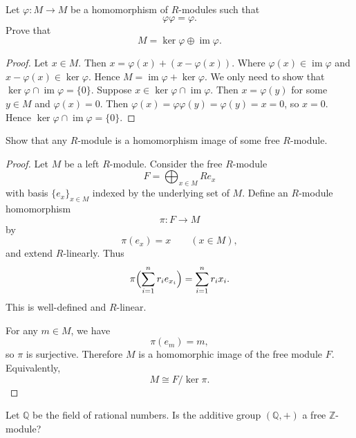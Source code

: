 \documentclass[11pt, a4paper]{report}
\begin{document}
\begin{exercise}
    Let $\varphi : M \to M$ be a homomorphism of $R$-modules such that
    \[
        \varphi\varphi=\varphi.
    \]
    Prove that
    \[
        M=\ker\varphi \oplus \operatorname{im}\varphi.
    \]
\end{exercise}

\begin{proof}
    Let $x \in M$. Then $x = \varphi(x) + (x - \varphi(x))$. Where $\varphi(x) \in
    \operatorname{im}\varphi$ and $x - \varphi(x) \in \ker\varphi$. Hence $M =
    \operatorname{im}\varphi + \ker\varphi$. We only need to show that $\ker\varphi \cap
    \operatorname{im}\varphi = \{0\}$.
    Suppose $x \in \ker\varphi \cap \operatorname{im}\varphi$. Then $x = \varphi(y)$ for some
    $y \in M$ and $\varphi(x) = 0$. Then $\varphi(x) = \varphi \varphi(y) = \varphi(y)=x=0$,
    so $x = 0$. Hence $\ker\varphi \cap \operatorname{im}\varphi = \{0\}$.
\end{proof}

\begin{exercise}
    Show that any $R$-module is a homomorphism image of some free $R$-module.
\end{exercise}

\begin{proof}
    Let $M$ be a left $R$-module. Consider the free $R$-module
    \[
        F=\bigoplus_{x\in M} Re_x
    \]
    with basis $\{e_x\}_{x\in M}$ indexed by the underlying set of $M$.
    Define an $R$-module homomorphism
    \[
        \pi:F\to M
    \]
    by
    \[
        \pi(e_x)=x \qquad (x\in M),
    \]
    and extend $R$-linearly. Thus
    \[
        \pi\Bigl(\sum_{i=1}^n r_i e_{x_i}\Bigr)=\sum_{i=1}^n r_i x_i.
    \]
    This is well-defined and $R$-linear.

    For any $m\in M$, we have
    \[
        \pi(e_m)=m,
    \]
    so $\pi$ is surjective. Therefore $M$ is a homomorphic image of the free module $F$.
    Equivalently,
    \[
        M\cong F/\ker\pi.
    \]
\end{proof}

\begin{exercise}
    Let $\mathbb{Q}$ be the field of rational numbers. Is the additive group
    $(\mathbb{Q},+)$ a free $\mathbb{Z}$-module?
\end{exercise}
\end{document}
